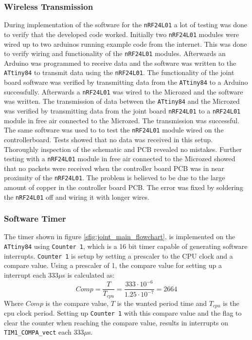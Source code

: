 {\subsubsection{Wireless Transmission}
\label{subs:wireless_transmission_joint}
During implementation of the software for the \texttt{nRF24L01} a lot of testing was done to verify that the developed code worked.
Initially two \texttt{nRF24L01} modules were wired up to two arduinos running example code from the internet. 
This was done to verify wiring and functionality of the \texttt{nRF24L01} modules.
Afterwards an Arduino was programmed to receive data and the software was written to the \texttt{ATtiny84} to transmit data using the \texttt{nRF24L01}.
The functionality of the joint board software was verified by transmitting data from the \texttt{ATtiny84} to a Arduino successfully.
Afterwards a \texttt{nRF24L01} was wired to the Microzed and the software was written.
The transmission of data between the \texttt{ATtiny84} and the Microzed was verified by transmitting data from the joint board \texttt{nRF24L01} to a \texttt{nRF24L01} module in free air connected to the Microzed.
The transmission was successful.
\\
The same software was used to to test the \texttt{nRF24L01} module wired on the controllerboard. 
Tests showed that no data was received in this setup.
Thoroughly inspection of the schematic and PCB revealed no mistakes. 
Further testing with a \texttt{nRF24L01} module in free air connected to the Microzed showed that no packets were received when the controller board PCB was in near proximity of the \texttt{nRF24L01}.
The problem is believed to be due to the large amount of copper in the controller board PCB.
The error was fixed by soldering the \texttt{nRF24L01} off and wiring it with longer wires.

\subsubsection{Software Timer}
\label{ssub:software_timer}
The timer shown in figure \ref{sfig:joint_main_flowchart}, is implemented on the \texttt{ATtiny84} using \texttt{Counter 1}, which is a 16 bit timer capable of generating software interrupts.
\texttt{Counter 1} is setup by setting a prescaler to the CPU clock and a compare value.
Using a prescaler of 1, the compare value for setting up a interrupt each 333$\mu$s is calculated as: 
\begin{equation}
	Comp = \frac{T}{T_{cpu}} = \frac{333 \cdot 10^{-6}}{1.25\cdot 10^{-7}} = 2664
\end{equation}
Where $Comp$ is the compare value, $T$ is the wanted period time and $T_{cpu}$ is the cpu clock period.
Setting up \texttt{Counter 1} with this compare value and the flag to clear the counter when reaching the compare value, results in interrupts on \texttt{TIM1\_COMPA\_vect} each 333$\mu$s.

}
